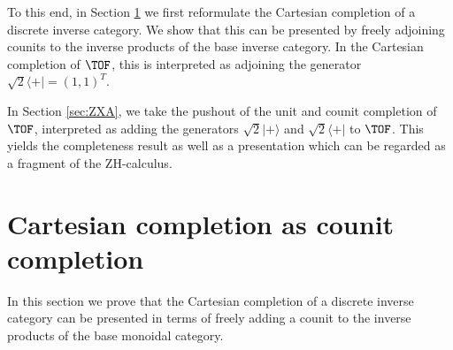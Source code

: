 To this end, in Section \ref{sec:cpm} we first reformulate the Cartesian completion of a discrete inverse category.  We show that this can be presented by freely adjoining counits to the inverse products of the base inverse category.   In the Cartesian completion of $\TOF$, this is interpreted as adjoining the generator $\sqrt 2 \langle + |=(1,1)^T$.

In Section \ref{sec:ZXA}, we take the pushout of the unit and counit completion of $\TOF$, interpreted as adding the generators $\sqrt 2|+ \rangle$ and $\sqrt 2\langle + |$ to $\TOF$.  This yields the completeness result as well as a presentation which can be regarded as a fragment of the ZH-calculus.
\section{Cartesian completion as counit completion}
\label{sec:cpm}
In this section we prove that the  Cartesian completion of a discrete inverse category can be presented in terms of freely adding a counit to the inverse products of the base monoidal category.  
